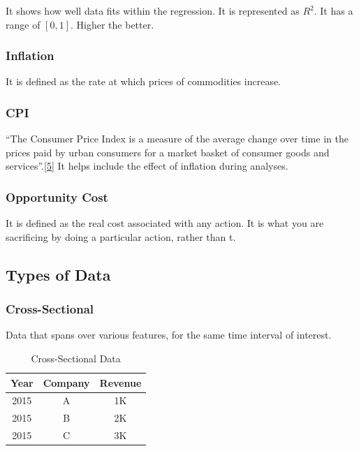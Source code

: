 \documentclass[
  english,
  doc,floatsintext]{apa6}
\begin{document}
It shows how well data fits within the regression. It is represented as \(R^2\). It has a range of \([0, 1]\). Higher the better.

\hypertarget{inflation}{%
\subsubsection{Inflation}\label{inflation}}

It is defined as the rate at which prices of commodities increase.

\hypertarget{cpi}{%
\subsubsection{CPI}\label{cpi}}

``The Consumer Price Index is a measure of the average change over time in the prices paid by urban consumers for a market basket of consumer goods and services''.\protect\hyperlink{ref-ConsumerPriceIndex}{{[}5{]}} It helps include the effect of inflation during analyses.

\hypertarget{opportunity-cost}{%
\subsubsection{Opportunity Cost}\label{opportunity-cost}}

It is defined as the real cost associated with any action. It is what you are sacrificing by doing a particular action, rather than t.

\hypertarget{types-of-data}{%
\subsection{Types of Data}\label{types-of-data}}

\hypertarget{cross-sectional}{%
\subsubsection{Cross-Sectional}\label{cross-sectional}}

Data that spans over various features, for the same time interval of interest.

\begin{table}[H]
  \begin{center}
  \begin{tabular}{|c|c|c|}
  \hline
  \textbf{Year} & \textbf{Company} & \textbf{Revenue} \\ \hline
  2015 & A       & 1K      \\ \hline
  2015 & B       & 2K      \\ \hline
  2015 & C       & 3K      \\ \hline
  \end{tabular}
  \end{center}
  
  \captionsetup{justification=centering}
  \caption{Cross-Sectional Data}
\end{table}
\end{document}
